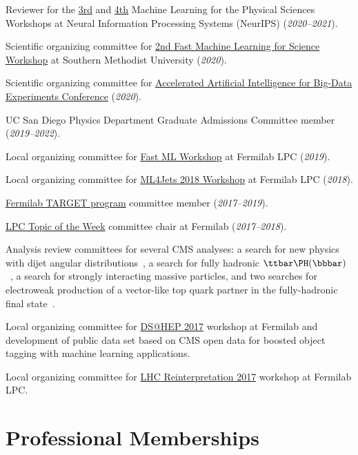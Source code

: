 \documentclass[11pt]{res}
\newif\ifext
\newenvironment{extended}{\ifext}{\fi}
\newcommand{\MarginText}[1]{\section{#1}\vspace{10pt}}
\begin{document}
\begin{resume}
  Reviewer for the \href{https://ml4physicalsciences.github.io/2020/}{3rd} and \href{https://ml4physicalsciences.github.io/2021/}{4th} Machine Learning for the Physical Sciences Workshops at Neural Information Processing Systems (NeurIPS) (\textit{2020--2021}).

  Scientific organizing committee for \href{https://indico.cern.ch/e/fml2020}{2nd Fast Machine Learning for Science Workshop} at Southern Methodist University (\textit{2020}).

  Scientific organizing committee for \href{http://www.ncsa.illinois.edu/Conferences/AcceleratedAINCSA/}{Accelerated Artificial Intelligence for Big-Data Experiments Conference} (\textit{2020}).

  UC San Diego Physics Department Graduate Admissions Committee member (\textit{2019--2022}).

  \begin{extended}

    Local organizing committee for \href{https://indico.cern.ch/e/fml}{Fast ML Workshop} at Fermilab LPC (\textit{2019}).

    Local organizing committee for \href{https://indico.cern.ch/e/ml4jets2018}{ML4Jets 2018 Workshop} at Fermilab LPC (\textit{2018}).

    \href{http://diversity.fnal.gov/target/}{Fermilab TARGET program} committee member (\textit{2017--2019}).

    \href{http://lpc.fnal.gov/programs/topic/}{LPC Topic of the Week} committee chair at Fermilab (\textit{2017--2018}).

    Analysis review committees for several CMS analyses: a search for new physics with dijet angular distributions~\cite{Sirunyan:2018wcm}, a search for fully hadronic $\ttbar\PH(\bbbar)$~\cite{Sirunyan:2018ygk}, a search for strongly interacting massive particles, and two searches for electroweak production of a vector-like top quark partner in the fully-hadronic final state~\cite{Sirunyan:2019xeh}.

    Local organizing committee for \href{http://dshep.fnal.gov}{DS@HEP 2017} workshop at Fermilab and development of public data set based on CMS open data for boosted object tagging with machine learning applications.

    Local organizing committee for \href{https://indico.cern.ch/event/639314/}{LHC Reinterpretation 2017} workshop at Fermilab LPC.

    \MarginText{Professional Memberships}


\end{extended}
\end{resume}
\end{document}
